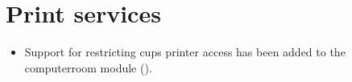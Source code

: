  




%

\section{Print services}
\begin{itemize}
\item Support for restricting cups printer access has been added to the computerroom module ().
\end{itemize}


